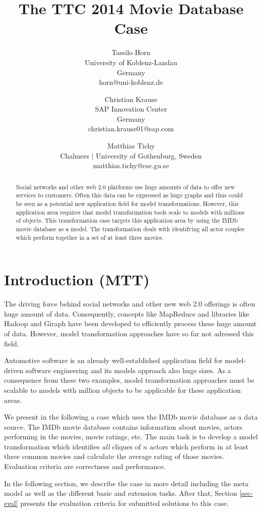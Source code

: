 \documentclass[a4paper,11pt]{article}
\title{The TTC 2014 Movie Database Case}
\author{
Tassilo Horn\\ University of Koblenz-Landau\\ Germany\\ horn@uni-koblenz.de
\and
Christian Krause\\ SAP Innovation Center\\ Germany\\ christian.krause01@sap.com
\and
Matthias Tichy\\ Chalmers $|$ University of Gothenburg, Sweden \\matthias.tichy@cse.gu.se
}
\begin{document}
\maketitle

\begin{abstract}
  Social networks and other web 2.0 platforms use huge amounts of data to offer
  new services to customers. Often this data can be expressed as huge graphs
  and thus could be seen as a potential new application field for model
  transformations. However, this application area requires that model
  transformation tools scale to models with millions of objects. This
  transformation case targets this application area by using the IMDb movie
  database as a model. The transformation deals with identifying all actor
  couples which perform together in a set of at least three movies.
  \end{abstract}
\vskip 32pt


\section{Introduction (MTT)}

The driving force behind social networks and other new web 2.0
offerings is often huge amount of data. Consequently, concepts like
MapReduce \cite{Dean08} and libraries like Hadoop \cite{Hadoop} and
Giraph \cite{Giraph} have been developed to efficiently process these
huge amount of data. However, model transformation approaches have so
far not adressed this field.

Automotive software is an already well-established application field
for model-driven software engineering and its models approach also
huge sizes. As a consequence from these two examples, model
transformation approaches must be scalable to models with million
objects to be applicable for these application areas.

We present in the following a case which uses the IMDb movie database
\cite{IMDBDATA} as a data source. The IMDb movie database contains
information about movies, actors performing in the movies, movie
ratings, etc. The main task is to develop a model transformation which
identifies \emph{all} cliques of $n$ actors which perform in at least
three common movies and calculate the average rating of those movies. Evaluation
criteria are correctness and performance.

In the following section, we describe the case in more detail
including the meta model as well as the different basic and extension
tasks. After that, Section \ref{sec-eval} presents the evaluation
criteria for submitted solutions to this case.
\end{document}
